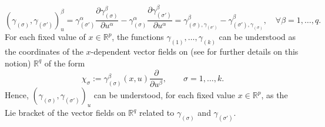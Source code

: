 \documentclass{birkjour}
\theoremstyle{definition}
\theoremstyle{remark}
\numberwithin{equation}{section}
\numberwithin{equation}{section}
\numberwithin{thm}{section}
\numberwithin{equation}{section}
\numberwithin{thm}{section}
\begin{document}
$$
(\gamma_{(\sigma)},\gamma_{(\sigma')})^\beta_u=\gamma_{(\sigma')}^\alpha\frac{\partial \gamma_{(\sigma)}^\beta}{\partial u^\alpha}-\gamma_{(\sigma)}^\alpha\frac{\partial \gamma_{(\sigma')}^\beta}{\partial u^\alpha}=\gamma^{\beta}_{(\sigma),\gamma_{(\sigma')}}-\gamma^{\beta}_{(\sigma'),\gamma_{(\sigma)}},\quad \forall \beta=1,\ldots,q.
$$
For each fixed value of $x\in \mathbb{R}^p$, the functions $\gamma_{(1)},\ldots,\gamma_{(k)}$ can be understood as the coordinates of  the $x$-dependent vector fields  on (see \cite{Dissertationes} for further details on this notion) $\mathbb{R}^{q}$  of the form
\begin{equation}
	\label{Eq:sigmaVector}
	\chi_\sigma:=\gamma_{(\sigma)}^\beta(x,u)\frac{\partial}{\partial u^\beta},\qquad \sigma=1,\ldots,k.
\end{equation}
Hence, $(\gamma_{(\sigma)},\gamma_{(\sigma')})_u$ can be understood, for each fixed value $x\in \mathbb{R}^p$, as the Lie bracket of the vector fields on $\mathbb{R}^q$ related to $\gamma_{(\sigma)}$ and $\gamma_{(\sigma')}$.
\end{document}
